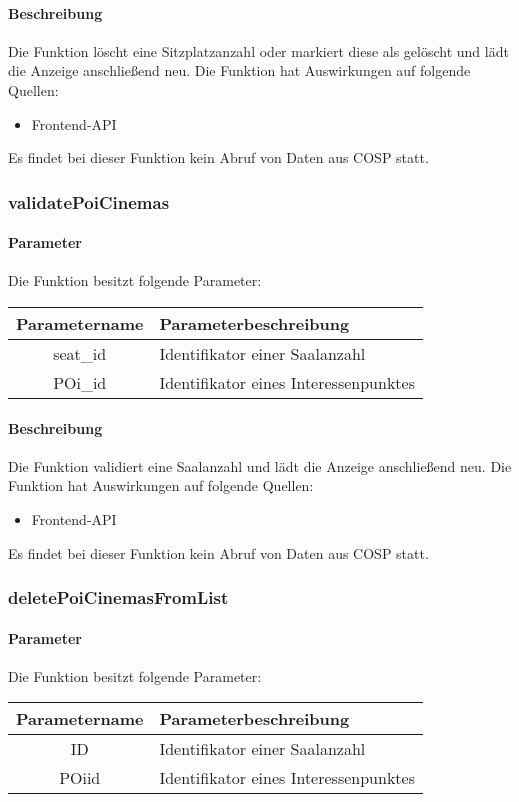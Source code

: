 \paragraph{Beschreibung} Die Funktion löscht eine Sitzplatzanzahl oder markiert diese als gelöscht und lädt die Anzeige anschließend neu. Die Funktion hat Auswirkungen auf folgende Quellen:
\begin{itemize}
	\item Frontend-API
\end{itemize}
Es findet bei dieser Funktion kein Abruf von Daten aus {\glqq COSP\grqq} statt.
\subsubsection{validatePoiCinemas}
\paragraph{Parameter} Die Funktion besitzt folgende Parameter:
\begin{table}[H]
	\begin{tabular}{|c|p{11cm}|}
		\hline
		\textbf{Parametername} & \textbf{Parameterbeschreibung} \\ \hline
		seat\_id & Identifikator einer Saalanzahl \\ \hline
		POi\_id  & Identifikator eines Interessenpunktes \\ \hline
	\end{tabular}
\end{table}
\paragraph{Beschreibung} Die Funktion validiert eine Saalanzahl und lädt die Anzeige anschließend neu. Die Funktion hat Auswirkungen auf folgende Quellen:
\begin{itemize}
	\item Frontend-API
\end{itemize}
Es findet bei dieser Funktion kein Abruf von Daten aus {\glqq COSP\grqq} statt.
\subsubsection{deletePoiCinemasFromList}
\paragraph{Parameter} Die Funktion besitzt folgende Parameter:
\begin{table}[H]
	\begin{tabular}{|c|p{11cm}|}
		\hline
		\textbf{Parametername} & \textbf{Parameterbeschreibung} \\ \hline
		ID     & Identifikator einer Saalanzahl \\ \hline
		POiid  & Identifikator eines Interessenpunktes \\ \hline
	\end{tabular}
\end{table}
